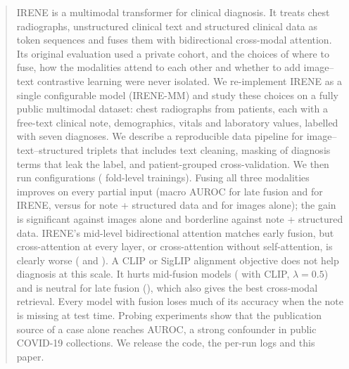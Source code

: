\begin{abstract}
\noindent
IRENE is a multimodal transformer for clinical diagnosis. It treats chest radiographs,
unstructured clinical text and structured clinical data as token sequences and fuses them
with bidirectional cross-modal attention. Its original evaluation used a private cohort,
and the choices of where to fuse, how the modalities attend to each other and whether to
add image--text contrastive learning were never isolated. We re-implement IRENE as a single
configurable model (IRENE-MM) and study these choices on a fully public multimodal dataset:
\NImages{} chest radiographs from \NPatients{} patients, each with a free-text clinical note,
demographics, vitals and laboratory values, labelled with seven diagnoses. We describe a
reproducible data pipeline for image--text--structured triplets that includes text cleaning,
masking of diagnosis terms that leak the label, and patient-grouped cross-validation. We then
run \NRuns{} configurations (\NFoldRuns{} fold-level trainings). Fusing all three modalities
improves on every partial input (macro AUROC  for late fusion and 
for IRENE, versus  for note + structured data and  for images
alone); the gain is significant against images alone and borderline against note + structured
data. IRENE's mid-level bidirectional attention matches early fusion, but cross-attention
at every layer, or cross-attention without self-attention, is clearly worse
( and ). A CLIP or SigLIP alignment objective does not help
diagnosis at this scale. It hurts mid-fusion models ( with CLIP,
$\lambda{=}0.5$) and is neutral for late fusion (), which also gives the
best cross-modal retrieval. Every model with fusion loses much of its accuracy when the note
is missing at test time. Probing experiments show that the publication source of a case alone
reaches  AUROC, a strong confounder in public COVID-19 collections. We release
the code, the per-run logs and this paper.
\end{abstract}
